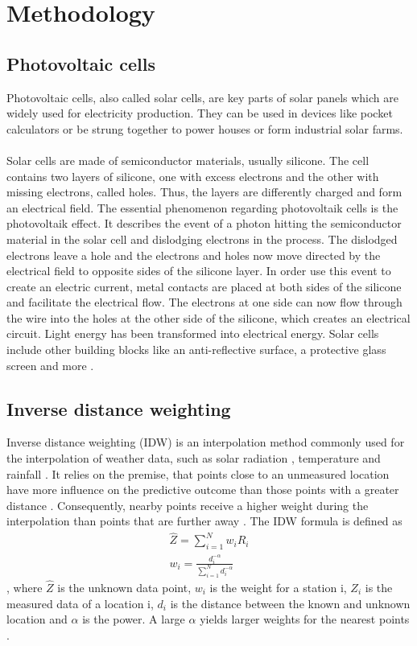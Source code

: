 \documentclass{article}
\begin{document}
\section{Methodology}
\subsection{Photovoltaic cells}\label{sec:pv}

Photovoltaic cells, also called solar cells, are key parts of solar panels which are widely used for electricity production. They can be used in devices like pocket calculators or be strung together to power houses or form industrial solar farms.
\\
\\
Solar cells are made of semiconductor materials, usually silicone. The cell contains two layers of silicone, one with excess electrons and the other with missing electrons, called holes. Thus, the layers are differently charged and form an electrical field. 
The essential phenomenon regarding photovoltaik cells is the photovoltaik effect. It describes the event of a photon hitting the semiconductor material in the solar cell and dislodging electrons in the process. The dislodged electrons leave a hole and the electrons and holes now move directed by the electrical field to opposite sides of the silicone layer. In order use this event to create an electric current, metal contacts are placed at both sides of the silicone and facilitate the electrical flow. The electrons at one side can now flow through the wire into the holes at the other side of the silicone, which creates an electrical circuit. Light energy has been transformed into electrical energy. Solar cells include other building blocks like an anti-reflective surface, a protective glass screen and more \citep{SolarCells}.

\subsection{Inverse distance weighting}
Inverse distance weighting (IDW) is an interpolation method commonly used for the interpolation of weather data, such as solar radiation \cite{Loghmari2018}, temperature \cite{Cao2009} and rainfall \cite{Chen2012}. 
It relies on the premise, that points close to an unmeasured location have more influence on the predictive outcome than those points with a greater distance \cite{Chen2012}. 
Consequently, nearby points receive a higher weight during the interpolation than points that are further away \cite{Lu2008}. 
The IDW formula is defined as
\begin{align}
    \hat{Z} = \sum_{i=1}^N w_iR_i \\
    w_i = \frac{d_i^{-\alpha}}{\sum_{i=1}^N{d_i^{-\alpha}}}
\end{align} \cite{Chen2012},
 where $\hat{Z}$ is the unknown data point, $w_i$ is the weight for a station i, $Z_i$ is the measured data of a location i, $d_i$ is the distance between the known and unknown location and $\alpha$ is the power. 
 A large $\alpha$ yields larger weights for the nearest points \cite{Lu2008}.
\end{document}
